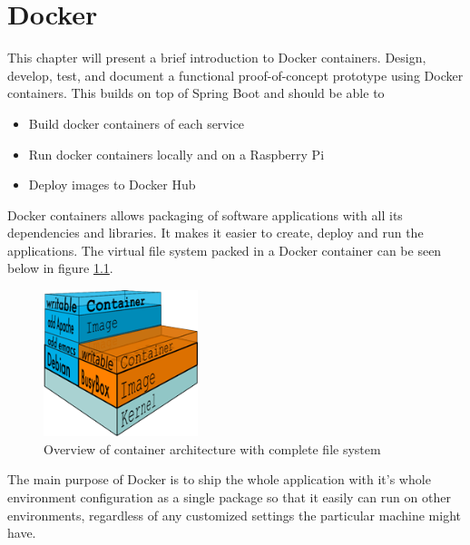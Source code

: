 \chapter{Docker}\label{ch:docker} \cite{joy2015performance} 
This chapter will present a brief introduction to Docker containers.  Design, develop, test, and document a functional proof-of-concept prototype using Docker containers. This builds on top of Spring Boot and should be able to

\begin{itemize}
\item Build docker containers of each service
\item Run docker containers locally and on a Raspberry Pi
\item Deploy images to Docker Hub
\end{itemize}


Docker containers allows packaging of software applications with all its dependencies and libraries. It makes it easier to create, deploy and run the applications. The virtual file system  packed in a Docker container can be seen below in figure \ref{fig:filesystem}.

\begin{figure}[bth]
  \centering

      \includegraphics[width=0.4\textwidth]{gfx/what_is_layered_filesystems_sm}
  \caption{Overview of container architecture with complete file system }
  \label{fig:filesystem}
  
\end{figure}


The main purpose of Docker is to ship the whole application with it's whole environment configuration as a single package so that it easily can run on other environments, regardless of any customized settings the particular machine might have.


